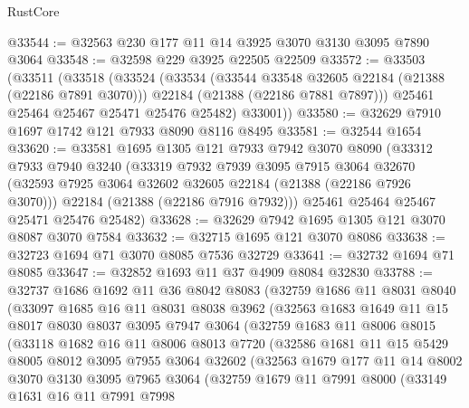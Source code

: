 \begin{lexlean}{RustCore}
\begin{coremodule}
@33544 := @32563 @230 @177 @11 @14 @3925 @3070 @3130 @3095 @7890 @3064
@33548 := @32598 @229 @3925 @22505 @22509
@33572 := @33503
    (@33511
      (@33518
        (@33524
          (@33534
            (@33544 @33548 @32605 @22184 (@21388 (@22186 @7891 @3070)))
            @22184
            (@21388 (@22186 @7881 @7897)))
          @25461
          @25464
          @25467
          @25471
          @25476
          @25482)
        @33001))
@33580 := @32629 @7910 @1697 @1742 @121 @7933 @8090 @8116 @8495
@33581 := @32544 @1654
@33620 := @33581
    @1695
    @1305
    @121
    @7933
    @7942
    @3070
    @8090
    (@33312
      @7933
      @7940
      @3240
      (@33319
        @7932
        @7939
        @3095
        @7915
        @3064
        @32670
        (@32593 @7925 @3064 @32602 @32605 @22184 (@21388 (@22186 @7926 @3070)))
        @22184
        (@21388 (@22186 @7916 @7932)))
      @25461
      @25464
      @25467
      @25471
      @25476
      @25482)
@33628 := @32629 @7942 @1695 @1305 @121 @3070 @8087 @3070 @7584
@33632 := @32715 @1695 @121 @3070 @8086
@33638 := @32723 @1694 @71 @3070 @8085 @7536 @32729
@33641 := @32732 @1694 @71 @8085
@33647 := @32852 @1693 @11 @37 @4909 @8084 @32830
@33788 := @32737
    @1686
    @1692
    @11
    @36
    @8042
    @8083
    (@32759
      @1686
      @11
      @8031
      @8040
      (@33097
        @1685
        @16
        @11
        @8031
        @8038
        @3962
        (@32563
          @1683
          @1649
          @11
          @15
          @8017
          @8030
          @8037
          @3095
          @7947
          @3064
          (@32759
            @1683
            @11
            @8006
            @8015
            (@33118
              @1682
              @16
              @11
              @8006
              @8013
              @7720
              (@32586
                @1681
                @11
                @15
                @5429
                @8005
                @8012
                @3095
                @7955
                @3064
                @32602
                (@32563
                  @1679
                  @177
                  @11
                  @14
                  @8002
                  @3070
                  @3130
                  @3095
                  @7965
                  @3064
                  (@32759
                    @1679
                    @11
                    @7991
                    @8000
                    (@33149
                      @1631
                      @16
                      @11
                      @7991
                      @7998

\end{coremodule}
\end{lexlean}
